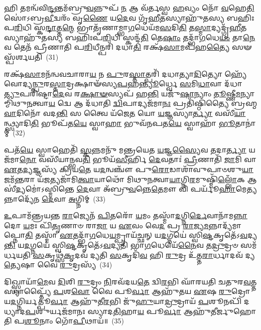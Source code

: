 𑌹𑌿 𑌤𑌮𑌨𑍍𑌵᳴𑌵𑌿\-\ul{𑌨𑍍𑌦}\-𑌨𑍍𑌤𑌮᳴𑌬𑍍𑌰𑍁\-\ul{𑌵}\-𑌨𑍍𑌨𑍁𑌪᳴ \ul{𑌨} 𑌆 𑌵᳴𑌰𑍍𑌤𑌸𑍍𑌵 \ul{𑌹}\-𑌵𑍍𑌯𑌂 𑌨𑍋᳴ \ul{𑌵}\-𑌹𑍇\-\ul{𑌤𑌿} 𑌸𑍋॑\-𑌽𑌬𑍍𑌰\-\ul{𑌵𑍀}\-𑌦𑍍𑌵𑌰𑌂᳴ 𑌵𑍃\-\ul{𑌣𑍈} 𑌯\-\ul{𑌦𑍇}\-𑌵 𑌗𑍃᳴\-\ul{𑌹𑍀}\-𑌤𑌸𑍍𑌯𑌾𑌹𑍁᳴𑌤𑌸𑍍𑌯 𑌬𑌹𑌿𑌃𑌪\-\ul{𑌰𑌿}\-𑌧𑌿 𑌸𑍍𑌕\-\ul{𑌨𑍍𑌦𑌾}\-𑌤𑍍𑌤\-\ul{𑌨𑍍𑌮𑍇} 𑌭𑍍𑌰𑌾𑌤𑍃᳴𑌣𑌾𑌮𑍍𑌭𑌾\-\ul{𑌗}\-𑌧𑍇𑌯᳴𑌮\-\ul{𑌸}\-𑌦𑌿\-\ul{𑌤𑌿} 𑌤\-\ul{𑌸𑍍𑌮𑌾}\-𑌦𑍍𑌯𑌦𑍍𑌗𑍃᳴\-\ul{𑌹𑍀}\-𑌤𑌸𑍍𑌯𑌾𑌹𑍁᳴𑌤𑌸𑍍𑌯 𑌬𑌹𑌿𑌃𑌪\-\ul{𑌰𑌿}\-𑌧𑌿 𑌸𑍍𑌕𑌨𑍍𑌦᳴\-\ul{𑌤𑌿} 𑌤𑍇\-\ul{𑌷𑌾𑌂} 𑌤𑌦𑍍𑌭𑌾᳴\-\ul{𑌗}\-𑌧𑍇\-\ul{𑌯𑌂} 𑌤𑌾\-\ul{𑌨𑍇}\-𑌵 𑌤𑍇𑌨᳴ 𑌪𑍍𑌰𑍀𑌣𑌾𑌤𑌿 𑌪\-\ul{𑌰𑌿}\-𑌧𑍀𑌨𑍍𑌪𑌰𑌿᳴ 𑌦𑌧𑌾\-\ul{𑌤𑌿} 𑌰𑌕𑍍𑌷᳴\-\ul{𑌸𑌾}\-𑌮𑌪᳴𑌹\-\ul{𑌤𑍍𑌯𑍈} 𑌸𑍟 𑌸𑍍𑌪᳴𑌰𑍍𑌶𑌯𑌤𑌿~(31)

𑌰𑌕𑍍𑌷᳴\-\ul{𑌸𑌾}\-𑌮𑌨᳴𑌨𑍍𑌵𑌵𑌚𑌾𑌰𑌾\-\ul{𑌯} 𑌨 \ul{𑌪𑍁}\-𑌰\-\ul{𑌸𑍍𑌤𑌾}\-𑌤𑍍𑌪𑌰𑌿᳴ 𑌦𑌧𑌾𑌤𑍍𑌯𑌾\-\ul{𑌦𑌿}\-𑌤𑍍𑌯𑍋 𑌹𑍍𑌯𑍇᳴𑌵𑍋𑌦𑍍𑌯\-\ul{𑌨𑍍𑌪𑍁}\-𑌰\-\ul{𑌸𑍍𑌤𑌾}\-𑌦𑍍𑌰𑌕𑍍𑌷𑌾𑍟᳴𑌸𑍍𑌯\-\ul{𑌪}\-𑌹\-\ul{𑌨𑍍𑌤𑍍𑌯𑍂}\-𑌰𑍍𑌧𑍍𑌵𑍇 \ul{𑌸}\-𑌮𑌿\-\ul{𑌧𑌾}\-𑌵𑌾 𑌦᳴𑌧𑌾\-\ul{𑌤𑍍𑌯𑍁}\-𑌪𑌰𑌿᳴𑌷𑍍𑌟𑌾\-\ul{𑌦𑍇}\-𑌵 𑌰\-\ul{𑌕𑍍𑌷𑌾}\-\-\ul{𑍟}\-𑌸𑍍𑌯𑌪᳴ 𑌹\-\ul{𑌨𑍍𑌤𑌿} 𑌯𑌜𑍁᳴\-\ul{𑌷𑌾}\-𑌨𑍍𑌯𑌾𑌂 \ul{𑌤𑍂}\-𑌷𑍍𑌣𑍀\-\ul{𑌮}\-𑌨𑍍𑌯𑌾𑌮𑍍𑌮𑌿᳴𑌥𑍁\-\ul{𑌨}\-𑌤𑍍𑌵𑌾\-\ul{𑌯} 𑌦𑍍𑌵𑍇 𑌆 𑌦᳴𑌧𑌾𑌤𑌿 \ul{𑌦𑍍𑌵𑌿}\-𑌪𑌾𑌦𑍍𑌯𑌜᳴𑌮𑌾\-\ul{𑌨𑌃} 𑌪𑍍𑌰𑌤𑌿᳴𑌷𑍍𑌠𑌿𑌤𑍍𑌯𑍈 𑌬𑍍𑌰𑌹𑍍𑌮\-\ul{𑌵𑌾}\-𑌦𑌿𑌨𑍋᳴ 𑌵𑌦\-\ul{𑌨𑍍𑌤𑌿} 𑌸 𑌤𑍍𑌵𑍈 𑌯᳴𑌜𑍇\-\ul{𑌤} 𑌯𑍋 \ul{𑌯}\-𑌜𑍍𑌞𑌸𑍍𑌯𑌾\-\ul{𑌰𑍍𑌤𑍍𑌯𑌾} 𑌵𑌸𑍀᳴\-\ul{𑌯𑌾}\-𑌨𑍍𑌥𑍍𑌸𑍍𑌯𑌾𑌦𑌿\-\ul{𑌤𑌿} 𑌭𑍂𑌪᳴𑌤\-\ul{𑌯𑍇} 𑌸𑍍𑌵𑌾\-\ul{𑌹𑌾} 𑌭𑍁𑌵᳴𑌨𑌪𑌤\-\ul{𑌯𑍇} 𑌸𑍍𑌵𑌾𑌹𑌾᳴ \ul{𑌭𑍂}\-𑌤𑌾𑌨𑌾॑𑌮𑍍~(32)

𑌪𑌤᳴\-\ul{𑌯𑍇} 𑌸𑍍𑌵𑌾𑌹𑍇𑌤𑌿᳴ \ul{𑌸𑍍𑌕}\-𑌨𑍍𑌨𑌮𑌨𑍁᳴ 𑌮𑌨𑍍𑌤𑍍𑌰𑌯𑍇𑌤 \ul{𑌯}\-𑌜𑍍𑌞\-\ul{𑌸𑍍𑌯𑍈}\-𑌵 𑌤𑌦𑌾\-\ul{𑌰𑍍𑌤𑍍𑌯𑌾} 𑌯𑌜᳴𑌮𑌾\-\ul{𑌨𑍋} 𑌵𑌸𑍀᳴𑌯𑌾𑌨𑍍𑌭𑌵\-\ul{𑌤𑌿} 𑌭𑍂𑌯᳴\-\ul{𑌸𑍀}\-𑌰𑍍\mbox{}𑌹𑌿 \ul{𑌦𑍇}\-𑌵𑌤𑌾𑌃॑ \ul{𑌪𑍍𑌰𑍀}\-𑌣𑌾𑌤𑌿᳴ \ul{𑌜𑌾}\-𑌮𑌿 𑌵𑌾 \ul{𑌏}\-𑌤\-\ul{𑌦𑍍𑌯}\-𑌜𑍍𑌞𑌸𑍍𑌯᳴ 𑌕𑍍𑌰𑌿𑌯\-\ul{𑌤𑍇} 𑌯\-\ul{𑌦}\-𑌨𑍍𑌵𑌞𑍍𑌚𑍗᳴ 𑌪𑍁\-\ul{𑌰𑍋}\-𑌡𑌾𑌶𑌾᳴𑌵𑍁𑌪𑌾𑍞𑌶𑍁\-\ul{𑌯𑌾}\-𑌜𑌮᳴\-\ul{𑌨𑍍𑌤}\-𑌰𑌾 𑌯᳴\-\ul{𑌜}\-𑌤𑍍𑌯𑌜𑌾᳴𑌮𑌿\-\ul{𑌤𑍍𑌵𑌾}\-𑌯𑌾𑌥𑍋᳴ 𑌮𑌿𑌥𑍁\-\ul{𑌨}\-𑌤𑍍𑌵𑌾\-\ul{𑌯𑌾}\-𑌗𑍍𑌨𑌿\-\ul{𑌰}\-𑌮𑍁𑌷𑍍𑌮𑌿᳴\-\ul{𑌲𑍍𑌲𑍋𑌁}\-𑌕 𑌆𑌸𑍀॑\-\ul{𑌦𑍍𑌯}\-𑌮𑍋॑\-𑌽𑌸𑍍𑌮𑌿𑌨𑍍𑌤𑍇 \ul{𑌦𑍇}\-𑌵𑌾 𑌅᳴𑌬𑍍𑌰𑍁\-\ul{𑌵}\-𑌨𑍍𑌨𑍇\-\ul{𑌤𑍇}\-𑌮𑍗 𑌵𑌿 𑌪𑌰𑍍𑌯𑍂᳴\-\ul{𑌹𑌾}\-𑌮𑍇\-\ul{𑌤𑍍𑌯}\-𑌨𑍍𑌨𑌾𑌦𑍍𑌯𑍇᳴𑌨 \ul{𑌦𑍇}\-𑌵𑌾 \ul{𑌅}\-𑌗𑍍𑌨𑌿𑌮𑍍~(33)

\-\ul{𑌉}\-𑌪𑌾𑌮᳴𑌨𑍍𑌤𑍍𑌰𑌯𑌨𑍍𑌤 \ul{𑌰𑌾}\-𑌜𑍍𑌯𑍇𑌨᳴ \ul{𑌪𑌿}\-𑌤𑌰𑍋᳴ \ul{𑌯}\-𑌮𑌂 𑌤𑌸𑍍𑌮𑌾᳴\-\ul{𑌦}\-𑌗𑍍𑌨𑌿\-\ul{𑌰𑍍𑌦𑍇}\-𑌵𑌾𑌨𑌾᳴𑌮\-\ul{𑌨𑍍𑌨𑌾}\-𑌦𑍋 \ul{𑌯}\-𑌮𑌃 𑌪𑌿᳴\-\ul{𑌤𑍃}\-𑌣𑌾𑍞 𑌰𑌾\-\ul{𑌜𑌾} 𑌯 \ul{𑌏}\-𑌵𑌂 𑌵𑍇\-\ul{𑌦} 𑌪𑍍𑌰 \ul{𑌰𑌾}\-𑌜𑍍𑌯\-\ul{𑌮}\-𑌨𑍍𑌨𑌾𑌦𑍍𑌯᳴𑌮𑌾𑌪𑍍𑌨𑍋\-\ul{𑌤𑌿} 𑌤𑌸𑍍𑌮𑌾᳴ \ul{𑌏}\-𑌤𑌦𑍍𑌭𑌾᳴\-\ul{𑌗}\-𑌧𑍇\-\ul{𑌯}\-𑌮𑍍𑌪𑍍𑌰𑌾𑌯᳴\-\ul{𑌚𑍍𑌛}\-𑌨𑍍 𑌯\-\ul{𑌦}\-𑌗𑍍𑌨𑌯𑍇॑ 𑌸𑍍𑌵𑌿\-\ul{𑌷𑍍𑌟}\-𑌕𑍃𑌤𑍇᳴\-𑌽\-\ul{𑌵}\-𑌦𑍍𑌯\-\ul{𑌨𑍍𑌤𑌿} 𑌯\-\ul{𑌦}\-𑌗𑍍𑌨𑌯𑍇॑ 𑌸𑍍𑌵𑌿\-\ul{𑌷𑍍𑌟}\-𑌕𑍃𑌤𑍇᳴\-𑌽\-\ul{𑌵}\-𑌦𑍍𑌯𑌤𑌿᳴ 𑌭𑌾\-\ul{𑌗}\-𑌧𑍇𑌯𑍇᳴\-\ul{𑌨𑍈}\-𑌵 𑌤\-\ul{𑌦𑍍𑌰𑍁}\-𑌦𑍍𑌰𑍞 𑌸𑌮᳴𑌰𑍍𑌧𑌯𑌤𑌿 \ul{𑌸}\-𑌕𑍃𑌥𑍍𑌸᳴\-\ul{𑌕𑍃}\-𑌦𑌵᳴ 𑌦𑍍𑌯𑌤𑌿 \ul{𑌸}\-𑌕𑍃𑌦𑌿᳴\-\ul{𑌵} 𑌹𑌿 \ul{𑌰𑍁}\-𑌦𑍍𑌰 𑌉᳴𑌤𑍍𑌤\-\ul{𑌰𑌾}\-𑌰𑍍𑌧𑌾𑌦𑌵᳴ 𑌦𑍍𑌯\-\ul{𑌤𑍍𑌯𑍇}\-𑌷𑌾 𑌵𑍈 \ul{𑌰𑍁}\-𑌦𑍍𑌰𑌸𑍍𑌯᳴~(34)

𑌦𑌿𑌖𑍍𑌸𑍍𑌵𑌾𑌯𑌾᳴\-\ul{𑌮𑍇}\-𑌵 \ul{𑌦𑌿}\-𑌶𑌿 \ul{𑌰𑍁}\-𑌦𑍍𑌰𑌂 \ul{𑌨𑌿}\-𑌰𑌵᳴𑌦𑌯\-\ul{𑌤𑍇} 𑌦𑍍𑌵𑌿\-\ul{𑌰}\-𑌭𑌿 𑌘𑌾᳴𑌰𑌯𑌤𑌿 𑌚𑌤𑍁𑌰\-\ul{𑌵}\-𑌤𑍍𑌤𑌸𑍍𑌯𑌾𑌪𑍍𑌤𑍍𑌯𑍈᳴ \ul{𑌪}\-𑌶\-\ul{𑌵𑍋} 𑌵𑍈 𑌪𑍂\-\ul{𑌰𑍍𑌵𑌾} 𑌆𑌹𑍁᳴𑌤𑌯 \ul{𑌏}\-𑌷 \ul{𑌰𑍁}\-𑌦𑍍𑌰𑍋 𑌯\-\ul{𑌦}\-𑌗𑍍𑌨𑌿𑌰𑍍𑌯𑌤𑍍𑌪𑍂\-\ul{𑌰𑍍𑌵𑌾} 𑌆𑌹𑍁᳴𑌤𑍀\-\ul{𑌰}\-𑌭𑌿 𑌜𑍁᳴\-\ul{𑌹𑍁}\-𑌯𑌾\-\ul{𑌦𑍍𑌰𑍁}\-𑌦𑍍𑌰𑌾𑌯᳴ \ul{𑌪}\-𑌶𑍂𑌨𑌪𑌿᳴ 𑌦𑌧𑍍𑌯𑌾𑌦\-\ul{𑌪}\-𑌶𑍁𑌰𑍍𑌯𑌜᳴𑌮𑌾𑌨𑌃 𑌸𑍍𑌯𑌾𑌦\-\ul{𑌤𑌿}\-𑌹𑌾\-\ul{𑌯} 𑌪𑍂\-\ul{𑌰𑍍𑌵𑌾} 𑌆𑌹𑍁᳴𑌤𑍀𑌰𑍍𑌜𑍁𑌹𑍋𑌤𑌿 𑌪\-\ul{𑌶𑍂}\-𑌨𑌾𑌂 𑌗𑍋᳴\-\ul{𑌪𑍀}\-𑌥𑌾𑌯᳴॥~(35)

